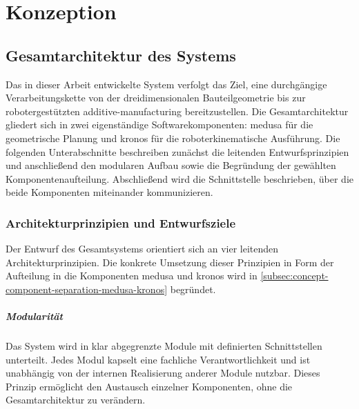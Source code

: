 \chapter{Konzeption}\label{chap:conception}
    \section{Gesamtarchitektur des Systems}\label{sec:overall-system-architecture}
        Das in dieser Arbeit entwickelte System verfolgt das Ziel, eine durchgängige Verarbeitungskette von der dreidimensionalen Bauteilgeometrie bis zur robotergestützten \gls{additive-manufacturing} bereitzustellen.
        Die Gesamtarchitektur gliedert sich in zwei eigenständige Softwarekomponenten: \ac{medusa} für die geometrische Planung und \ac{kronos} für die roboterkinematische Ausführung.
        Die folgenden Unterabschnitte beschreiben zunächst die leitenden Entwurfsprinzipien und anschließend den modularen Aufbau sowie die Begründung der gewählten Komponentenaufteilung.
        Abschließend wird die Schnittstelle beschrieben, über die beide Komponenten miteinander kommunizieren.

        \subsection{Architekturprinzipien und Entwurfsziele}\label{subsec:architecture-principles-and-design-goals}
            Der Entwurf des Gesamtsystems orientiert sich an vier leitenden
            Architekturprinzipien.
            Die konkrete Umsetzung dieser Prinzipien in Form der Aufteilung in die Komponenten \ac{medusa} und \ac{kronos} wird in \cref{subsec:concept-component-separation-medusa-kronos} begründet.

            \paragraph{Modularität}
                Das System wird in klar abgegrenzte Module mit definierten Schnittstellen unterteilt.
                Jedes Modul kapselt eine fachliche Verantwortlichkeit und ist unabhängig von der internen Realisierung anderer Module nutzbar.
                Dieses Prinzip ermöglicht den Austausch einzelner Komponenten, ohne die Gesamtarchitektur zu verändern.

